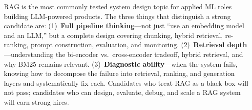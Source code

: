 \bigskip
\begin{keyinsight}
RAG is the most commonly tested system design topic for applied ML roles
building LLM-powered products.  The three things that distinguish a strong
candidate are: (1)~\textbf{Full pipeline thinking}---not just ``use an
embedding model and an LLM,'' but a complete design covering chunking,
hybrid retrieval, re-ranking, prompt construction, evaluation, and monitoring.
(2)~\textbf{Retrieval depth}---understanding the bi-encoder vs.\ cross-encoder
tradeoff, hybrid retrieval, and why BM25 remains relevant.
(3)~\textbf{Diagnostic ability}---when the system fails, knowing how to
decompose the failure into retrieval, ranking, and generation layers and
systematically fix each.  Candidates who treat RAG as a black box will not
pass; candidates who can design, evaluate, debug, and scale a RAG system
will earn strong hires.
\end{keyinsight}
